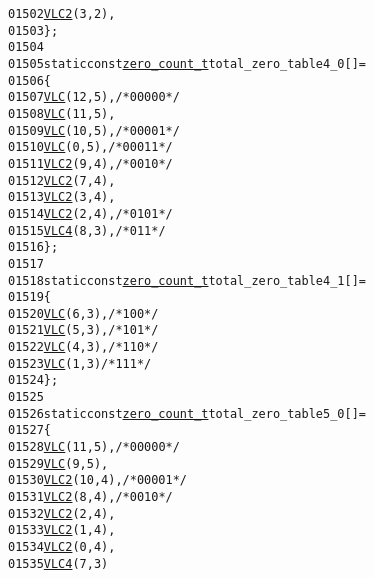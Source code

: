 \begin{footnotesize}
\begin{alltt}
01502         \hyperlink{vlc_8h_ad3cda36b9c6132357c7f7de5e52a6c93}{VLC2}(3, 2),
01503 \};
01504 
01505 \textcolor{keyword}{static} \textcolor{keyword}{const} \hyperlink{structzero__count__t}{zero_count_t} total\_zero\_table4\_0[] = 
01506 \{
01507         \hyperlink{vlc_8h_a7f3572774a720fd9b4bc3b1a0b65082f}{VLC}(12, 5), \textcolor{comment}{/* 0000 0 */}
01508         \hyperlink{vlc_8h_a7f3572774a720fd9b4bc3b1a0b65082f}{VLC}(11, 5),
01509         \hyperlink{vlc_8h_a7f3572774a720fd9b4bc3b1a0b65082f}{VLC}(10, 5), \textcolor{comment}{/* 0000 1 */}
01510         \hyperlink{vlc_8h_a7f3572774a720fd9b4bc3b1a0b65082f}{VLC}(0, 5),  \textcolor{comment}{/* 0001 1 */}
01511         \hyperlink{vlc_8h_ad3cda36b9c6132357c7f7de5e52a6c93}{VLC2}(9, 4), \textcolor{comment}{/* 0010 */}
01512         \hyperlink{vlc_8h_ad3cda36b9c6132357c7f7de5e52a6c93}{VLC2}(7, 4),
01513         \hyperlink{vlc_8h_ad3cda36b9c6132357c7f7de5e52a6c93}{VLC2}(3, 4),
01514         \hyperlink{vlc_8h_ad3cda36b9c6132357c7f7de5e52a6c93}{VLC2}(2, 4), \textcolor{comment}{/* 0101 */}
01515         \hyperlink{vlc_8h_a02cdc921d8f03450b12879e8afb222cb}{VLC4}(8, 3), \textcolor{comment}{/* 011 */}
01516 \};
01517 
01518 \textcolor{keyword}{static} \textcolor{keyword}{const} \hyperlink{structzero__count__t}{zero_count_t} total\_zero\_table4\_1[] = 
01519 \{
01520         \hyperlink{vlc_8h_a7f3572774a720fd9b4bc3b1a0b65082f}{VLC}(6, 3),   \textcolor{comment}{/* 100 */}
01521         \hyperlink{vlc_8h_a7f3572774a720fd9b4bc3b1a0b65082f}{VLC}(5, 3),   \textcolor{comment}{/* 101 */}
01522         \hyperlink{vlc_8h_a7f3572774a720fd9b4bc3b1a0b65082f}{VLC}(4, 3),   \textcolor{comment}{/* 110 */}
01523         \hyperlink{vlc_8h_a7f3572774a720fd9b4bc3b1a0b65082f}{VLC}(1, 3)    \textcolor{comment}{/* 111 */}
01524 \};
01525 
01526 \textcolor{keyword}{static} \textcolor{keyword}{const} \hyperlink{structzero__count__t}{zero_count_t} total\_zero\_table5\_0[] = 
01527 \{
01528         \hyperlink{vlc_8h_a7f3572774a720fd9b4bc3b1a0b65082f}{VLC}(11, 5),  \textcolor{comment}{/* 0000 0 */}
01529         \hyperlink{vlc_8h_a7f3572774a720fd9b4bc3b1a0b65082f}{VLC}(9, 5),
01530         \hyperlink{vlc_8h_ad3cda36b9c6132357c7f7de5e52a6c93}{VLC2}(10, 4), \textcolor{comment}{/* 0000 1 */}
01531         \hyperlink{vlc_8h_ad3cda36b9c6132357c7f7de5e52a6c93}{VLC2}(8, 4),  \textcolor{comment}{/* 0010 */}
01532         \hyperlink{vlc_8h_ad3cda36b9c6132357c7f7de5e52a6c93}{VLC2}(2, 4),
01533         \hyperlink{vlc_8h_ad3cda36b9c6132357c7f7de5e52a6c93}{VLC2}(1, 4),
01534         \hyperlink{vlc_8h_ad3cda36b9c6132357c7f7de5e52a6c93}{VLC2}(0, 4),
01535         \hyperlink{vlc_8h_a02cdc921d8f03450b12879e8afb222cb}{VLC4}(7, 3)

\end{alltt}
\end{footnotesize}
